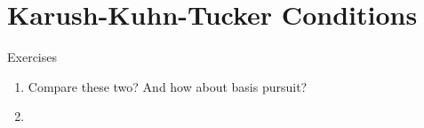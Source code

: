 \chapter{Karush-Kuhn-Tucker Conditions}
\label{chap:kkt}


\begin{xcb}{Exercises}
\begin{enumerate}[label=\thechapter.\arabic*]
\settowidth{\leftmargini}{18.99.\hskip\labelsep}
\item \label{ex:lasso_dantzig}
Compare these two? And how about basis pursuit?

\item \label{ex:simplex_projection}

\end{enumerate}
\end{xcb}